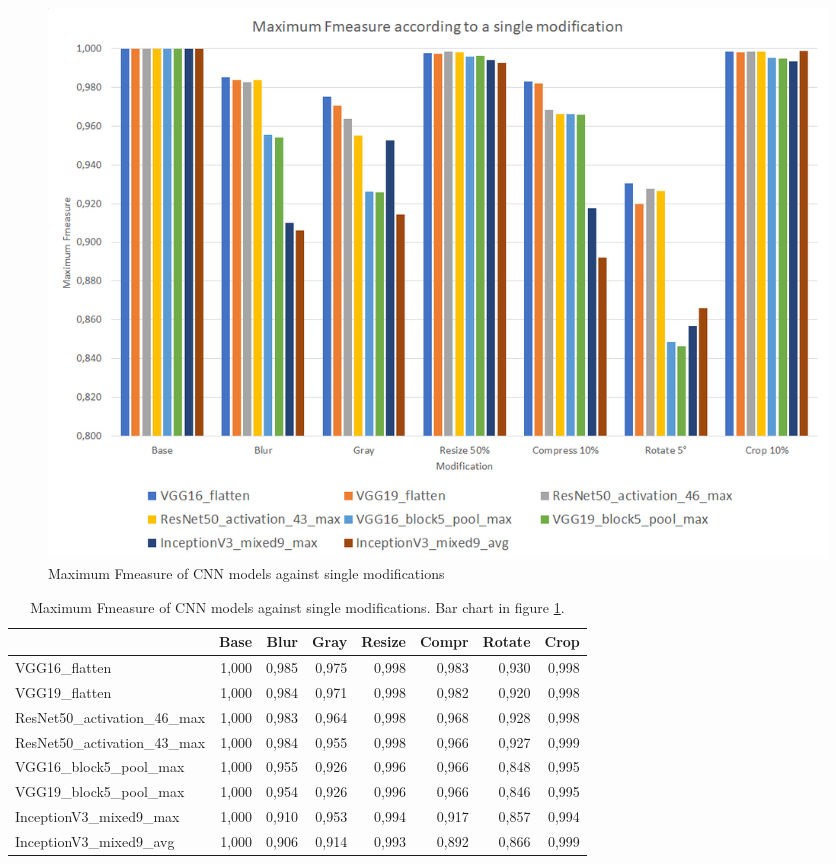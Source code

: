 \begin{figure}
	\centering
	\includegraphics[totalheight=0.7\textheight]{img/cnn_benchmark_single.png}
	\caption{Maximum Fmeasure of CNN models against single modifications}
	\label{fig:cnn_benchmark_single}
\end{figure}

\begin{table}
	\begin{tabular}{|l|rrrrrrr|}
    \hline
                                  &  Base &  Blur &  Gray & Resize & Compr & Rotate &  Crop  \\
    \hline                                                                           
    VGG16\_flatten                & 1,000 & 0,985 & 0,975 &  0,998 & 0,983 &  0,930 & 0,998  \\
    VGG19\_flatten                & 1,000 & 0,984 & 0,971 &  0,998 & 0,982 &  0,920 & 0,998  \\
    ResNet50\_activation\_46\_max & 1,000 & 0,983 & 0,964 &  0,998 & 0,968 &  0,928 & 0,998  \\
    ResNet50\_activation\_43\_max & 1,000 & 0,984 & 0,955 &  0,998 & 0,966 &  0,927 & 0,999  \\
    VGG16\_block5\_pool\_max      & 1,000 & 0,955 & 0,926 &  0,996 & 0,966 &  0,848 & 0,995  \\
    VGG19\_block5\_pool\_max      & 1,000 & 0,954 & 0,926 &  0,996 & 0,966 &  0,846 & 0,995  \\
    InceptionV3\_mixed9\_max      & 1,000 & 0,910 & 0,953 &  0,994 & 0,917 &  0,857 & 0,994  \\
    InceptionV3\_mixed9\_avg      & 1,000 & 0,906 & 0,914 &  0,993 & 0,892 &  0,866 & 0,999  \\
    \hline
	\end{tabular}
	\caption{Maximum Fmeasure of CNN models against single modifications. Bar chart in figure \ref{fig:cnn_benchmark_single}.}
	\label{table:cnn_benchmark_single}
\end{table}

